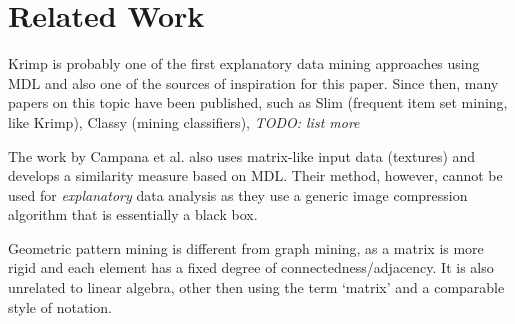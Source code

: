 \documentclass{llncs}
\begin{document}
\section{Related Work}

Krimp \cite{krimp} is probably one of the first explanatory data mining approaches using MDL and also one of the sources of inspiration for this paper. Since then, many papers on this topic have been published, such as Slim \cite{slim} (frequent item set mining, like Krimp), Classy \cite{classy} (mining classifiers), \emph{TODO: list more}

The work by Campana et al. \cite{campana2010compression} also uses matrix-like input data (textures) and develops a similarity measure based on MDL. Their method, however, cannot be used for \emph{explanatory} data analysis as they use a generic image compression algorithm that is essentially a black box.

Geometric pattern mining is different from graph mining, as a matrix is more rigid and each element has a fixed degree of connectedness/adjacency. It is also unrelated to linear algebra, other then using the term `matrix' and a comparable style of notation. 
\end{document}
